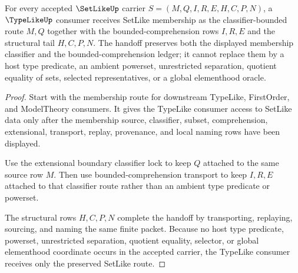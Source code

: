 \begin{theorem}
\label{thm:setlike-typelike-consumer-handoff}
For every accepted $\SetLikeUp$ carrier $S=(M,Q,I,R,E,H,C,P,N)$, a $\TypeLikeUp$ consumer receives SetLike membership as the classifier-bounded route $M,Q$ together with the bounded-comprehension rows $I,R,E$ and the structural tail $H,C,P,N$. The handoff preserves both the displayed membership classifier and the bounded-comprehension ledger; it cannot replace them by a host type predicate, an ambient powerset, unrestricted separation, quotient equality of sets, selected representatives, or a global elementhood oracle.
\end{theorem}
\begin{proof}
Start with the membership route for downstream TypeLike, FirstOrder, and ModelTheory consumers. It gives the TypeLike consumer access to SetLike data only after the membership source, classifier, subset, comprehension, extensional, transport, replay, provenance, and local naming rows have been displayed.

Use the extensional boundary classifier lock to keep $Q$ attached to the same source row $M$. Then use bounded-comprehension transport to keep $I,R,E$ attached to that classifier route rather than an ambient type predicate or powerset.

The structural rows $H,C,P,N$ complete the handoff by transporting, replaying, sourcing, and naming the same finite packet. Because no host type predicate, powerset, unrestricted separation, quotient equality, selector, or global elementhood coordinate occurs in the accepted carrier, the TypeLike consumer receives only the preserved SetLike route.
\end{proof}


